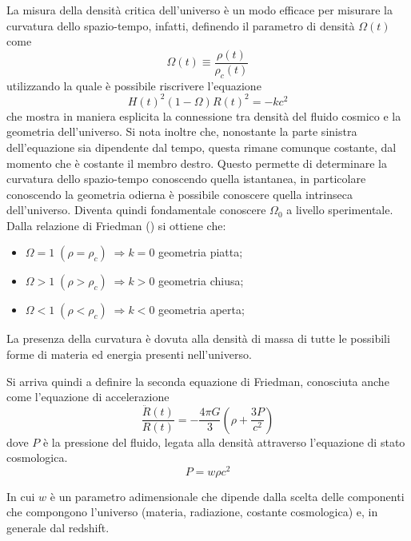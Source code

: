 La misura della densità critica dell'universo è un modo efficace per misurare la curvatura dello spazio-tempo, infatti, definendo il parametro di densità $\Omega(t)$ come
\begin{equation}\label{eq:parametro-densità}
    \Omega (t) \equiv  \frac{\rho (t)}{\rho_c (t)}
\end{equation}
utilizzando la quale è possibile riscrivere l'equazione~
\begin{equation}\label{eq:friedman-omega}
    {H(t)}^2 (1-\Omega){R(t)}^2 = -kc^2
\end{equation}
che mostra in maniera esplicita la connessione tra densità del fluido cosmico e la geometria dell'universo. Si nota inoltre che, nonostante la parte sinistra dell'equazione sia dipendente dal tempo, questa rimane comunque costante, dal momento che è costante il membro destro. Questo permette di determinare la curvatura dello spazio-tempo conoscendo quella istantanea, in particolare conoscendo la geometria odierna è possibile conoscere quella intrinseca dell'universo. Diventa quindi fondamentale conoscere $\Omega_0$ a livello sperimentale.
Dalla relazione di Friedman () si ottiene che:
\begin{itemize}
    \item $\Omega = 1 \; (\rho = \rho_c)\; \Rightarrow k = 0$ geometria piatta;
    \item $\Omega > 1 \; (\rho > \rho_c)\; \Rightarrow k > 0$ geometria chiusa;
    \item $\Omega < 1 \; (\rho < \rho_c)\; \Rightarrow k < 0$ geometria aperta;
\end{itemize}
La presenza della curvatura è dovuta alla densità di massa di tutte le possibili forme di materia ed energia presenti nell'universo.

Si arriva quindi a definire la seconda equazione di Friedman, conosciuta anche come l'equazione di accelerazione
\begin{equation}\label{eq:second-friedman}
    \frac{\ddot{R}(t)}{R(t)} = - \frac{4\pi G}{3} \left( {\rho + \frac{3P}{c^2}} \right)
\end{equation}
dove $P$ è la pressione del fluido, legata alla densità attraverso l'equazione di stato cosmologica.
\begin{equation}\label{eq:equazione-stato-cosmologica}
    P = w \rho c^2
\end{equation}

In cui $w$ è un parametro adimensionale che dipende dalla scelta delle componenti che compongono l'universo (materia, radiazione, costante cosmologica) e, in generale dal redshift.